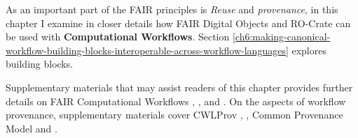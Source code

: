As an important part of the FAIR principles is \emph{Reuse} and \emph{provenance}, in this chapter I examine in closer details how FAIR Digital Objects and RO-Crate can be used with \textbf{Computational Workflows}. 
Section \vref{ch6:making-canonical-workflow-building-blocks-interoperable-across-workflow-languages} explores building blocks.

Supplementary materials that may assist readers of this chapter provides further details on FAIR Computational Workflows \cite{Goble 2020},  \cite{Goble 2021},  \cite{Crusoe 2022} and  \cite{ch6-37}. 
On the aspects of workflow provenance, supplementary materials cover CWLProv \cite{Khan 2019},  \cite{De Geest 2022}, Common Provenance Model \cite{Wittner 2020,Wittner 2023} and  \cite{workflow-run-crate}.
